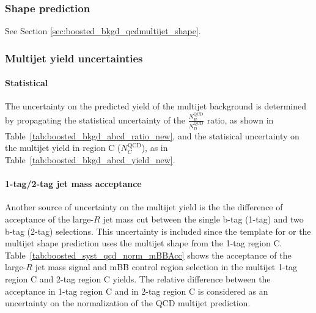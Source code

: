 \subsubsection{Shape prediction}
See Section \ref{sec:boosted_bkgd_qcdmultijet_shape}.

\subsubsection{Multijet yield uncertainties}
\label{sec:boosted_bkgd_qcdmultijet_yield_unc}
 
\paragraph{Statistical} 
The uncertainty on the predicted yield of the multijet background is determined by propagating the statistical uncertainty
of the $\frac{N_B^\text{QCD}}{N_D^\text{QCD}}$ ratio, as shown in Table~\ref{tab:boosted_bkgd_abcd_ratio_new}, and the statisical
uncertainty on the multijet yield in region C ($N_C^\text{QCD}$), as in Table~\ref{tab:boosted_bkgd_abcd_yield_new}.
 
\paragraph{1-tag/2-tag jet mass acceptance} 
Another source of uncertainty on the multijet yield is the  
the difference of acceptance of the large-$R$ jet mass cut between the single b-tag (1-tag) and two b-tag (2-tag) selections.
This uncertainty is included since the template for or the multijet shape prediction uses the multijet shape
from the 1-tag region C. Table~\ref{tab:boosted_syst_qcd_norm_mBBAcc} shows the acceptance
of the large-$R$ jet mass signal and mBB control region selection in the multijet 1-tag region C and 2-tag region C yields.
The relative difference between the acceptance in 1-tag region C and in 2-tag region C is considered as an uncertainty on the normalization
of the QCD multijet prediction.
 

